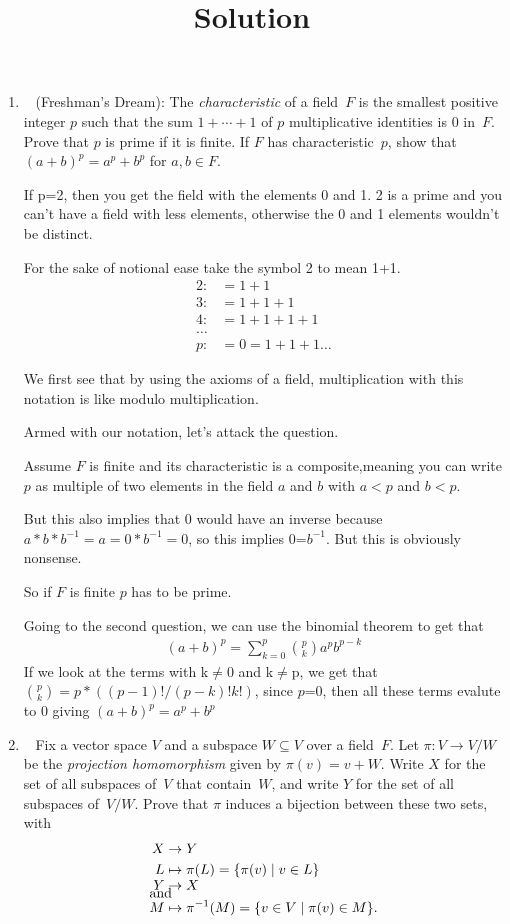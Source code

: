 \documentclass[11pt]{article}
\newcommand\score[1]{\marginpar{\vspace{-2ex}\color{blue}{#1/3}}\hspace{-1ex}}
\newcommand\0{\mathbf{0}}
\newcommand\<{\langle}
\renewcommand\>{\rangle}
\begin{document}
\begin{enumerate}
\item\ \score{}%
(Freshman's Dream): The \emph{characteristic} of a field~$F$ is the
smallest positive integer $p$ such that the sum $1 + \cdots + 1$ of
$p$ multiplicative identities is $0$ in~$F$.  Prove that $p$ is prime
if it is finite.  If $F$ has characteristic~$p$, show that $(a + b)^p
= a^p + b^p$ for $a,b \in F$.

\title{Solution}
\linebreak
If p=2, then you get the field with the elements 0 and 1. 2 is a prime
and you can't have a field with less elements, otherwise the 0 and 1 elements wouldn't be distinct.

For the sake of notional ease take the symbol 2 to mean 1+1.
\begin{align*} 
    2:&=1+1 \\ 
    3:&=1+1+1 \\
    4:&=1+1+1+1\\
    \dots\\
    p:&=0=1+1+1\dots
\end{align*}

We first see that by using the axioms of a field, multiplication with this notation is like modulo multiplication.

Armed with our notation, let's attack the question.

Assume $F$ is finite and its characteristic is a composite,meaning you can write $p$ as multiple of two elements in the field $a$ and $b$ with  
$a<p$ and  $b<p$.

But this also implies that 0 would have an inverse because $a*b*b^{-1}=a=0*b^{-1}=0$, so this implies 0=$b^{-1}$. But this is obviously nonsense.

So if $F$ is finite $p$ has to be prime.

Going to the second question, we can use the binomial theorem to get that
\begin{align}
    (a+b)^p=\sum_{k=0}^{p} { p \choose k}a^{p}b^{p-k}
\end{align}
If we look at the terms with k$\neq $0 and k$\neq$p, we get that ${p \choose k}= p*((p-1)!/(p-k)!k!)$, since $p$=0, then all these terms evalute to 0 giving $(a+b)^{p}=a^p+b^p$

\pagebreak


\item\ \score{}%
Fix a vector space $V$ and a subspace $W \subseteq V$ over a
field~$F$.  Let $\pi: V \to V/W$ be the \emph{projection homomorphism}
given by $\pi(v) = v + W$.  Write $X$ for the set of all subspaces
of~$V$ that contain~$W$, and write $Y$ for the set of all subspaces
of~$V/W$.  Prove that $\pi$ induces a bijection between these two
sets, with
\begin{align*}
X &\to Y
\\
L &\mapsto \pi(L) = \{\pi(v) \mid v \in L\}\\
\intertext{and}\\[-8.75ex]
Y &\to X
\\
M &\mapsto \pi^{-1}(M) = \{v \in V \mid \pi(v) \in M\}.
\end{align*}


\end{enumerate}
\end{document}
